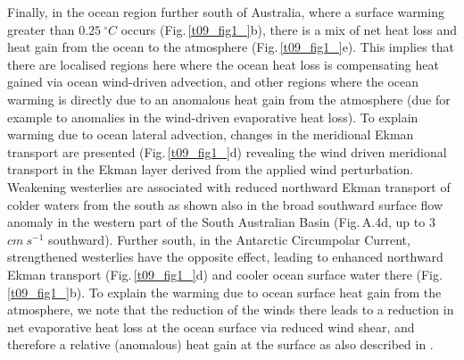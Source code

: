 \documentclass[draft,linenumbers]{agujournal2018}
\begin{document}
Finally, in the ocean region further south of Australia, where a surface warming greater than $0.25\ ^{\circ}C$ occurs (Fig.\,\ref{t09_fig1_}b), there is a mix of net heat loss and heat gain from the ocean to the atmosphere (Fig.\,\ref{t09_fig1_}e). This implies that there are localised regions here where the ocean heat loss is compensating heat gained via ocean wind-driven advection, and other regions where the ocean warming is directly due to an anomalous heat gain from the atmosphere (due for example to anomalies in the wind-driven evaporative heat loss). To explain warming due to ocean lateral advection, changes in the meridional Ekman transport are presented (Fig.\,\ref{t09_fig1_}d) revealing the wind driven meridional transport in the Ekman layer derived from the applied wind perturbation. Weakening westerlies are associated with reduced northward Ekman transport of colder waters from the south \citep{SenGupta2006} as shown also in the broad southward surface flow anomaly in the western part of the South Australian Basin (Fig.\,A.4d, up to 3 $cm\ s^{-1}$ southward). Further south, in the Antarctic Circumpolar Current, strengthened westerlies have the opposite effect, leading to enhanced northward Ekman transport (Fig.\,\ref{t09_fig1_}d) and cooler ocean surface water there (Fig.\,\ref{t09_fig1_}b). To explain the warming due to ocean surface heat gain from the atmosphere, we note that the reduction of the winds there leads to a reduction in net evaporative heat loss at the ocean surface via reduced wind shear, and therefore a relative (anomalous) heat gain at the surface as also described in \citet{SenGupta2006}. 
\end{document}
